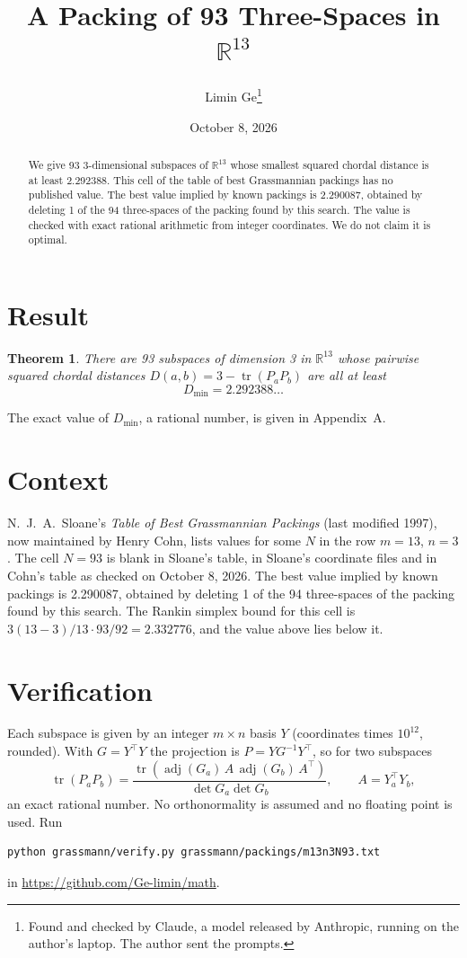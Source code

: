 \documentclass[11pt,a4paper]{article}
\title{A Packing of 93 Three-Spaces in $\mathbb{R}^{13}$}
\author{Limin Ge\thanks{Found and checked by Claude, a model released by Anthropic, running on the author's laptop. The author sent the prompts.}}
\date{October 8, 2026}
\newtheorem*{theorem}{Theorem}
\begin{document}
\maketitle
\begin{abstract}
We give 93 3-dimensional subspaces of $\mathbb{R}^{13}$ whose smallest squared chordal distance is at least 2.292388. This cell of the table of best Grassmannian packings has no published value. The best value implied by known packings is 2.290087, obtained by deleting 1 of the 94 three-spaces of the packing found by this search. The value is checked with exact rational arithmetic from integer coordinates. We do not claim it is optimal.
\end{abstract}

\section{Result}
\begin{theorem}
There are 93 subspaces of dimension 3 in $\mathbb{R}^{13}$ whose pairwise squared chordal distances $D(a,b) = 3 - \operatorname{tr}(P_aP_b)$ are all at least
\[ D_{\min} = 2.292388\ldots \]
\end{theorem}
The exact value of $D_{\min}$, a rational number, is given in Appendix~A.


\section{Context}
N.~J.~A.~Sloane's \emph{Table of Best Grassmannian Packings} (last modified 1997), now maintained by Henry Cohn, lists values for some $N$ in the row $m=13$, $n=3$. The cell $N=93$ is blank in Sloane's table, in Sloane's coordinate files and in Cohn's table as checked on October 8, 2026. The best value implied by known packings is 2.290087, obtained by deleting 1 of the 94 three-spaces of the packing found by this search. The Rankin simplex bound for this cell is $3(13-3)/13\cdot 93/92 = 2.332776$, and the value above lies below it.


\section{Verification}
Each subspace is given by an integer $m\times n$ basis $Y$ (coordinates times $10^{12}$, rounded). With $G=Y^\top Y$ the projection is $P=YG^{-1}Y^\top$, so for two subspaces
\[ \operatorname{tr}(P_aP_b)=\frac{\operatorname{tr}(\operatorname{adj}(G_a)\,A\,\operatorname{adj}(G_b)\,A^\top)}{\det G_a\det G_b},\qquad A=Y_a^\top Y_b, \]
an exact rational number. No orthonormality is assumed and no floating point is used. Run
\begin{verbatim}
python grassmann/verify.py grassmann/packings/m13n3N93.txt
\end{verbatim}
in \url{https://github.com/Ge-limin/math}.
\end{document}

